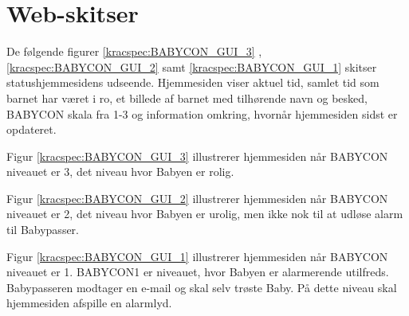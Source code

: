 \section{Web-skitser} \label{Ikke-funk:webskitser}


De følgende figurer \ref{kracspec:BABYCON_GUI_3} , \ref{kracspec:BABYCON_GUI_2} samt \ref{kracspec:BABYCON_GUI_1} skitser statushjemmesidens udseende. Hjemmesiden viser aktuel tid, samlet tid som barnet har været i ro, et billede af barnet med tilhørende navn og besked, BABYCON skala fra 1-3 og information omkring, hvornår hjemmesiden sidst er opdateret.


Figur \ref{kracspec:BABYCON_GUI_3} illustrerer hjemmesiden når BABYCON niveauet er 3, det niveau hvor Babyen er rolig.


Figur \ref{kracspec:BABYCON_GUI_2} illustrerer hjemmesiden når BABYCON niveauet er 2, det niveau hvor Babyen er urolig, men ikke nok til at udløse alarm til Babypasser.


Figur \ref{kracspec:BABYCON_GUI_1} illustrerer hjemmesiden når BABYCON niveauet er 1. BABYCON1 er niveauet, hvor Babyen er alarmerende utilfreds. Babypasseren modtager en e-mail og skal selv trøste Baby. På dette niveau skal hjemmesiden afspille en alarmlyd.